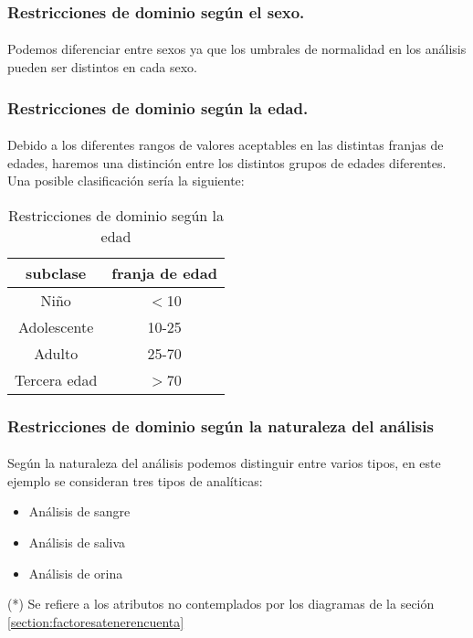 \documentclass[a4paper,10pt]{article}
\begin{document}
\subsubsection{Restricciones de dominio según el sexo.}
\paragraph{}
Podemos diferenciar entre sexos ya que los umbrales de normalidad en los análisis pueden ser distintos en cada sexo.

\subsubsection{Restricciones de dominio según la edad.}
\paragraph{}
Debido a los diferentes rangos de valores aceptables en las distintas franjas de edades, haremos una distinción entre los distintos grupos de edades diferentes. Una posible clasificación sería la siguiente:
\begin{table}[hbt]
		\begin{center}
		\begin{tabular}{|c|c|}\hline
			subclase & franja de edad \\ \hline
			Niño & $<$10 \\ \hline
			Adolescente & 10-25 \\ \hline
			Adulto & 25-70 \\ \hline
			Tercera edad & $>$70 \\ \hline
		\end{tabular}
		\caption{Restricciones de dominio según la edad}
	\end{center}
\end{table}
\subsubsection{Restricciones de dominio según la naturaleza del análisis}
\paragraph{}
Según la naturaleza del análisis podemos distinguir entre varios tipos, en este ejemplo se consideran tres tipos de analíticas:
\begin{itemize}
	\item Análisis de sangre
	\item Análisis de saliva
	\item Análisis de orina
\end{itemize}
\vfill
\begin{flushright}

	\small
	(*) Se refiere a los atributos no contemplados por los diagramas de la seción \ref{section:factoresatenerencuenta}
\end{flushright}
\end{document}

